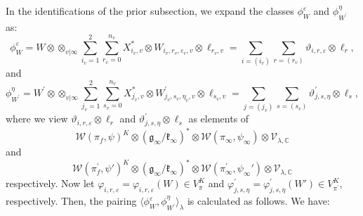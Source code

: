 \documentclass[10pt, twoside]{amsart}
\theoremstyle{plain}
\theoremstyle{definition}
\theoremstyle{remark}
\numberwithin{equation}{subsection}
\def\C{\mathbb C}
\def\calw{\mathcal W}
\def\scrv{\mathscr V}
\begin{document}
In the identifications of the prior subsection, we expand the classes $\phi^\varepsilon_W$ and $\phi^\eta_{W^\prime}$ as:
\begin{equation*}
\phi^\varepsilon_W = W \otimes \otimes_{v|\infty} \sum_{i_v =1}^2 \sum_{r_v = 0}^{n_v} X_{i_v,v}^*  \otimes W_{i_v, r_v, \varepsilon_v, v} \otimes \ell_{r_v, v} = \sum_{i = (i_v)} \sum_{r = (r_v)} \vartheta_{i, r, \varepsilon} \otimes \ell_r , 
\end{equation*}
and
\begin{equation*}
\phi^\eta_{W^\prime} = W^\prime \otimes \otimes_{v|\infty} \sum_{j_v =1}^2 \sum_{s_v = 0}^{n_v} X_{j_v,v}^*  \otimes W^\prime_{j_v, s_v, \eta_v, v} \otimes \ell_{s_v, v} = \sum_{j = (j_v)} \sum_{s = (s_v)} \vartheta^\prime_{j, s, \eta} \otimes \ell_s, 
\end{equation*}
where we view $\vartheta_{i, r, \varepsilon} \otimes \ell_r$ and $\vartheta^\prime_{j, s, \eta} \otimes \ell_s$ as elements of 
\[\calw (\pi_f,\psi)^K \otimes (\mathfrak g_\infty/\mathfrak k_\infty)^* \otimes \calw (\pi_\infty,\psi_\infty) \otimes \scrv_{\lambda,\C}\] 
and 
\[\calw (\pi^\prime_f,\psi')^K \otimes (\mathfrak g_\infty/\mathfrak k_\infty)^* \otimes \calw (\pi^\prime_\infty,\psi_\infty') \otimes \scrv_{\lambda,\C}\] respectively. Now let $\varphi_{i, r, \varepsilon} = \varphi_{i,r,\varepsilon}(W) \in V_\pi^K$ and $\varphi^\prime_{j, s, \eta} = \varphi^\prime_{j,s,\eta}(W') \in V^K_{\pi^\prime}$, respectively. Then, the pairing $\langle \phi^\varepsilon_W, \phi^\eta_{W^\prime} \rangle_{\lambda}$ is calculated as follows. We have:
\end{document}
